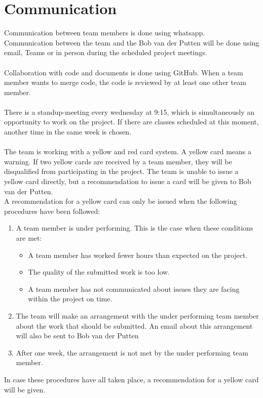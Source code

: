 \documentclass{article} %
\begin{document}
\newpage

\section{Communication}
Communication between team members is done using whatsapp.
\\
Communication between the team and the Bob van der Putten
will be done using email, Teams or in person during the scheduled project meetings.
\\\\
Collaboration with code and documents is done using GitHub.
When a team member wants to merge code, the code is reviewed by at least one other team member.
\\\\
There is a standup-meeting every wednesday at 9:15, which is simultaneously an opportunity to work on the project. If there are classes scheduled at this moment, another time in the same week is chosen.
\\\\
The team is working with a yellow and red card system.
A yellow card means a warning. If two yellow cards are received by a team member,
they will be disqualified from participating in the project.
The team is unable to issue a yellow card directly, but a recommendation to issue a card
will be given to Bob van der Putten.
\\
A recommendation for a yellow card can only be issued when the following procedures have been followed:
\begin{enumerate}
    \item A team member is under performing. This is the case when these conditions are met:
          \begin{itemize}
              \item A team member has worked fewer hours than expected on the project.
              \item The quality of the submitted work is too low.
              \item A team member has not communicated about issues they are facing within the project on time.
          \end{itemize}
    \item The team will make an arrangement with the under performing team member about the work that should be submitted.
          An email about this arrangement will also be sent to Bob van der Putten
    \item After one week, the arrangement is not met by the under performing team member.
\end{enumerate}
In case these procedures have all taken place, a recommendation for a yellow card will be given.
\end{document}
